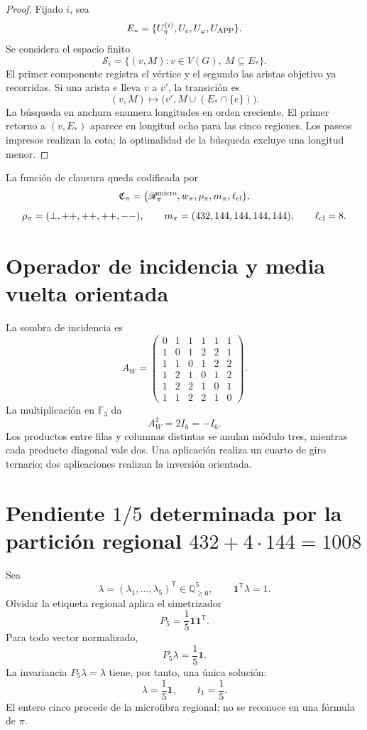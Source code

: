 \begin{proof}
Fijado \(i\), sea
\[
 E_*=\{U_\pi^{(i)},U_e,U_\varphi,U_{\rm APP}\}.
\]
Se considera el espacio finito
\[
 \mathscr S_i=\{(v,M):v\in V(G),\ M\subseteq E_*\}.
\]
El primer componente registra el vértice y el segundo las aristas objetivo
ya recorridas. Si una arista \(e\) lleva \(v\) a \(v'\), la transición es
\[
 (v,M)\longmapsto
 \bigl(v',M\cup(E_*\cap\{e\})\bigr).
\]
La búsqueda en anchura enumera longitudes en orden creciente. El primer
retorno a \((v,E_*)\) aparece en longitud ocho para las cinco regiones.
Los paseos impresos realizan la cota; la optimalidad de la búsqueda excluye
una longitud menor.
\end{proof}

La función de clausura queda codificada por
\[
 \mathfrak C_\pi=
 \bigl(\mathscr R_\pi^{\rm micro},
 w_\pi,\rho_\pi,m_\pi,\ell_{\rm cl}\bigr),
\]
\[
 \rho_\pi=(\perp,++ ,++ ,++ ,--),
 \qquad
 m_\pi=(432,144,144,144,144),
 \qquad
 \ell_{\rm cl}=8.
\]

\section{Operador de incidencia y media vuelta orientada}

La sombra de incidencia es
\[
 A_W=
 \begin{pmatrix}
 0&1&1&1&1&1\\
 1&0&1&2&2&1\\
 1&1&0&1&2&2\\
 1&2&1&0&1&2\\
 1&2&2&1&0&1\\
 1&1&2&2&1&0
 \end{pmatrix}.
\]
La multiplicación en \(\mathbb F_3\) da
\begin{equation}
 \boxed{A_W^2=2I_6=-I_6.}
 \label{gfp:b:eq:aw-cuadrado-menos-identidad-pi}
\end{equation}
Los productos entre filas y columnas distintas se anulan módulo tres,
mientras cada producto diagonal vale dos. Una aplicación realiza un cuarto
de giro ternario; dos aplicaciones realizan la inversión orientada.

\section{Pendiente \texorpdfstring{\(1/5\)}{1/5} determinada por la partición regional \(432+4\cdot144=1008\)}

Sea
\[
 \lambda=(\lambda_1,\ldots,\lambda_5)^{\mathsf T}
 \in\mathbb Q_{\geq0}^5,
 \qquad
 \mathbf1^{\mathsf T}\lambda=1.
\]
Olvidar la etiqueta regional aplica el simetrizador
\[
 P_5=\frac15\mathbf1\mathbf1^{\mathsf T}.
\]
Para todo vector normalizado,
\[
 P_5\lambda=\frac15\mathbf1.
\]
La invariancia \(P_5\lambda=\lambda\) tiene, por tanto, una única solución:
\begin{equation}
 \boxed{\lambda=\frac15\mathbf1,\qquad t_1=\frac15.}
 \label{gfp:b:eq:pendiente-primitiva-pi}
\end{equation}
El entero cinco procede de la microfibra regional; no se reconoce en una
fórmula de \(\pi\).

